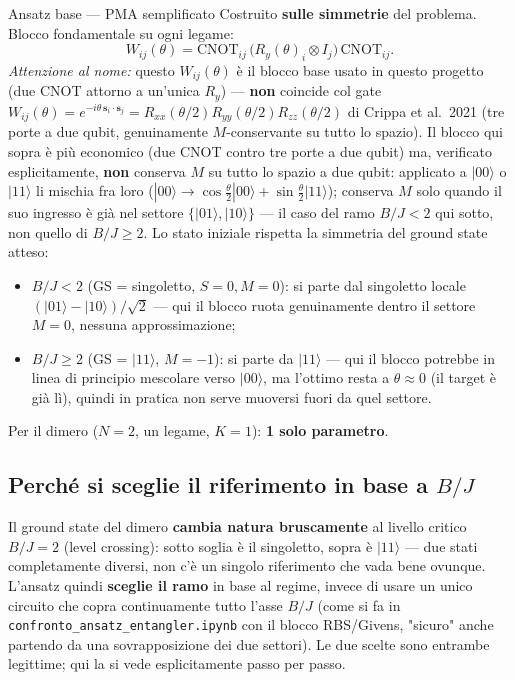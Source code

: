 \documentclass[11pt,a4paper]{article}
\begin{document}
\begin{panelbox}{Ansatz base --- PMA semplificato}
Costruito \textbf{sulle simmetrie} del problema. Blocco fondamentale su
ogni legame:
$$W_{ij}(\theta) = \text{CNOT}_{ij}\,\big(R_y(\theta)_i\otimes I_j\big)\,\text{CNOT}_{ij}.$$
\emph{Attenzione al nome:} questo $W_{ij}(\theta)$ è il blocco base usato
in questo progetto (due CNOT attorno a un'unica $R_y$) --- \textbf{non}
coincide col gate $W_{ij}(\theta)=e^{-i\theta\,\mathbf s_i\cdot\mathbf
s_j}=R_{xx}(\theta/2)R_{yy}(\theta/2)R_{zz}(\theta/2)$ di Crippa et al.\
2021 (tre porte a due qubit, genuinamente $M$-conservante su tutto lo
spazio). Il blocco qui sopra è più economico (due CNOT contro tre porte
a due qubit) ma, verificato esplicitamente, \textbf{non} conserva $M$ su
tutto lo spazio a due qubit: applicato a $|00\rangle$ o $|11\rangle$ li
mischia fra loro ($|00\rangle\to\cos\frac\theta2|00\rangle+
\sin\frac\theta2|11\rangle$); conserva $M$ solo quando il suo ingresso è
già nel settore $\{|01\rangle,|10\rangle\}$ --- il caso del ramo
$B/J<2$ qui sotto, non quello di $B/J\geq2$.
Lo stato iniziale rispetta la simmetria del ground state atteso:
\begin{itemize}[leftmargin=1.3em,itemsep=0.1em]
\item $B/J<2$ (GS = singoletto, $S=0,M=0$): si parte dal singoletto
locale $(|01\rangle-|10\rangle)/\sqrt2$ --- qui il blocco ruota
genuinamente dentro il settore $M=0$, nessuna approssimazione;
\item $B/J\geq2$ (GS = $|11\rangle$, $M=-1$): si parte da $|11\rangle$
--- qui il blocco potrebbe in linea di principio mescolare verso
$|00\rangle$, ma l'ottimo resta a $\theta\approx0$ (il target è già lì),
quindi in pratica non serve muoversi fuori da quel settore.
\end{itemize}
Per il dimero ($N=2$, un legame, $K=1$): \textbf{1 solo parametro}.
\end{panelbox}

\subsection*{Perché si sceglie il riferimento in base a $B/J$}

Il ground state del dimero \textbf{cambia natura bruscamente} al livello
critico $B/J=2$ (level crossing): sotto soglia è il singoletto, sopra è
$|11\rangle$ --- due stati completamente diversi, non c'è un singolo
riferimento che vada bene ovunque. L'ansatz quindi \textbf{sceglie il
ramo} in base al regime, invece di usare un unico circuito che copra
continuamente tutto l'asse $B/J$ (come si fa in
\texttt{confronto\_ansatz\_entangler.ipynb} con il blocco RBS/Givens,
"sicuro" anche partendo da una sovrapposizione dei due settori). Le due
scelte sono entrambe legittime; qui la si vede esplicitamente passo per
passo.
\end{document}
